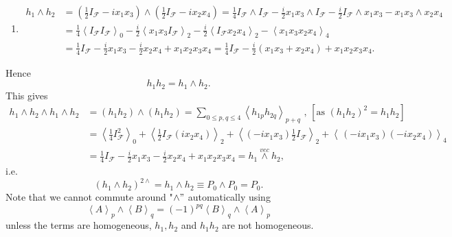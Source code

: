 \documentclass[aps,preprint]{revtex4}%
\begin{document}
\begin{enumerate}
\item
\begin{align}
h_{1}\wedge h_{2} &  =\left(  \frac{1}{2}I_{\mathcal{F}}-ix_{1}x_{3}\right)
\wedge\left(  \frac{1}{2}I_{\mathcal{F}}-ix_{2}x_{4}\right)  =\frac{1}%
{4}I_{\mathcal{F}}\wedge I_{\mathcal{F}}-\frac{i}{2}x_{1}x_{3}\wedge
I_{\mathcal{F}}-\frac{i}{2}I_{\mathcal{F}}\wedge x_{1}x_{3}-x_{1}x_{3}\wedge
x_{2}x_{4}\\
&  =\frac{1}{4}\left\langle I_{\mathcal{F}}I_{\mathcal{F}}\right\rangle
_{0}-\frac{i}{2}\left\langle x_{1}x_{3}I_{\mathcal{F}}\right\rangle _{2}%
-\frac{i}{2}\left\langle I_{\mathcal{F}}x_{2}x_{4}\right\rangle _{2}%
-\left\langle x_{1}x_{3}x_{2}x_{4}\right\rangle _{4}\\
&  =\frac{1}{4}I_{\mathcal{F}}-\frac{i}{2}x_{1}x_{3}-\frac{i}{2}x_{2}%
x_{4}+x_{1}x_{2}x_{3}x_{4}=\frac{1}{4}I_{\mathcal{F}}-\frac{i}{2}\left(
x_{1}x_{3}+x_{2}x_{4}\right)  +x_{1}x_{2}x_{3}x_{4}.
\end{align}

\end{enumerate}

Hence
\begin{equation}
h_{1}h_{2}=h_{1}\wedge h_{2}.
\end{equation}
This gives
\begin{align}
h_{1}\wedge h_{2}\wedge h_{1}\wedge h_{2} &  =\left(  h_{1}h_{2}\right)
\wedge\left(  h_{1}h_{2}\right)  =\sum_{0\leq p,q\leq4}\left\langle
h_{1p}h_{2q}\right\rangle _{p+q}\text{ , }\left[  \text{as }\left(  h_{1}%
h_{2}\right)  ^{2}=h_{1}h_{2}\right]  \\
&  =\left\langle \frac{1}{4}I_{\mathcal{F}}^{2}\right\rangle _{0}+\left\langle
\frac{1}{2}I_{\mathcal{F}}\left(  ix_{2}x_{4}\right)  \right\rangle
_{2}+\left\langle \left(  -ix_{1}x_{3}\right)  \frac{1}{2}I_{\mathcal{F}%
}\right\rangle _{2}+\left\langle \frac{{}}{{}}\left(  -ix_{1}x_{3}\right)
\left(  -ix_{2}x_{4}\right)  \right\rangle _{4}\\
&  =\frac{1}{4}I_{\mathcal{F}}-\frac{i}{2}x_{1}x_{3}-\frac{i}{2}x_{2}%
x_{4}+x_{1}x_{2}x_{3}x_{4}=h_{1}\overset{vec}{\wedge}h_{2},
\end{align}
i.e.
\begin{equation}
\left(  h_{1}\wedge h_{2}\right)  ^{2\wedge}=h_{1}\wedge h_{2}\equiv
P_{0}\wedge P_{0}=P_{0}.
\end{equation}
Note that we cannot commute around "$\wedge"$ automatically using
\begin{equation}
\left\langle A\right\rangle _{p}\wedge\left\langle B\right\rangle _{q}=\left(
-1\right)  ^{pq}\left\langle B\right\rangle _{q}\wedge\left\langle
A\right\rangle _{p}%
\end{equation}
unless the terms are homogeneous, $h_{1},h_{2}$ and $h_{1}h_{2}$ are not homogeneous.%
\end{document}

